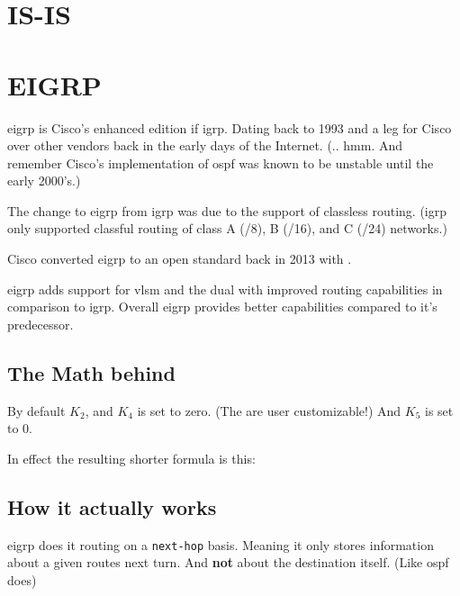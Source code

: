 \newpage

\section{IS-IS}

\newpage

\section{EIGRP}

\gls{eigrp} is Cisco's enhanced edition if \gls{igrp}. Dating back to 1993 and a
leg for Cisco over other vendors back in the early days of the Internet. (..
hmm. And remember Cisco's implementation of \gls{ospf} was known to be unstable
until the early 2000's.)

The change to \gls{eigrp} from \gls{igrp} was due to the support of classless
routing. (\gls{igrp} only supported classful routing of class A (/8), B (/16),
and C (/24) networks.)

Cisco converted \gls{eigrp} to an open standard back in 2013 with
.\cite{wiki:Enhanced_Interior_Gateway_Routing_Protocol}

\gls{eigrp} adds support for \gls{vlsm} and the \gls{dual} with improved routing
capabilities in comparison to \gls{igrp}. Overall \gls{eigrp} provides better
capabilities compared to it's predecessor.

\subsection[Math]{The Math behind}


By default $K_2$, and $K_4$ is set to zero. (The are user customizable!) And
$K_5$ is set to 0.

In effect the resulting shorter formula is this:


\subsection{How it actually works}

\gls{eigrp} does it routing on a \texttt{next-hop} basis. Meaning it only stores
information about a given routes next turn. And \textbf{not} about the
destination itself. (Like \gls{ospf} does)

